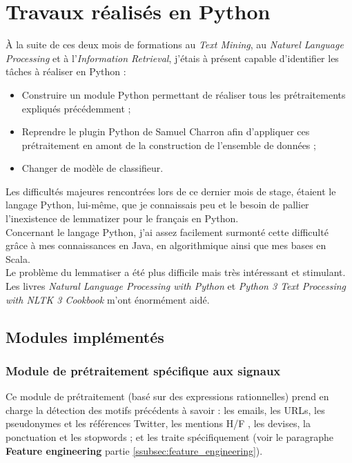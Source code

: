 \section{Travaux réalisés en Python}
\label{sec:travaux_python}
    À la suite de ces deux mois de formations au \textit{Text Mining}, au \textit{Naturel Language Processing} et à l'\textit{Information Retrieval}, j'étais à présent capable d'identifier les tâches à réaliser en Python :
    \begin{itemize}
        \item Construire un module Python permettant de réaliser tous les prétraitements expliqués précédemment ;
        \item Reprendre le plugin Python de Samuel Charron afin d'appliquer ces prétraitement en amont de la construction de l'ensemble de données ;
        \item Changer de modèle de classifieur.\\
    \end{itemize}

    Les difficultés majeures rencontrées lors de ce dernier mois de stage, étaient le langage Python, lui-même, que je connaissais peu et le besoin de pallier l'inexistence de lemmatizer pour le français en Python.\\
    Concernant le langage Python, j'ai assez facilement surmonté cette difficulté grâce à mes connaissances en Java, en algorithmique ainsi que mes bases en Scala.\\
    Le problème du lemmatiser a été plus difficile mais très intéressant et stimulant.\\
    Les livres \textit{Natural Language Processing with Python}\autocite{nlp_p} et \textit{Python 3 Text Processing with NLTK 3 Cookbook}\autocite{nltk} m'ont énormément aidé.

    \subsection{Modules implémentés}
        \subsubsection{Module de prétraitement spécifique aux signaux}
            Ce module de prétraitement (basé sur des expressions rationnelles) prend en charge la détection des motifs précédents à savoir : les emails, les URLs, les pseudonymes et les références Twitter, les mentions \og H/F \fg, les devises, la ponctuation et les stopwords ; et les traite spécifiquement (voir le paragraphe \textbf{Feature engineering} partie \ref{ssubsec:feature_engineering}).

